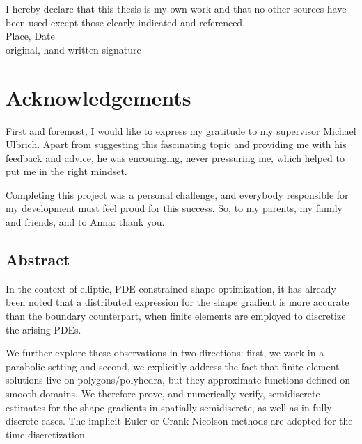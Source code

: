 \documentclass[english,a4paper,9pt,oneside]{scrbook}	%
\theoremstyle{break}
\theoremstyle{remark}
\begin{document}
\vspace*{23cm}
\noindent
I hereby declare that this thesis is my own work and that no other sources have been used except those clearly indicated and referenced.
\\[2cm]
Place, Date\\
original, hand-written signature
\newpage

\chapter*{Acknowledgements}

First and foremost, I would like to express my gratitude to my supervisor Michael Ulbrich. Apart from suggesting this fascinating topic and providing me with his feedback and advice, he was encouraging, never pressuring me, which helped to put me in the right mindset.

Completing this project was a personal challenge, and everybody responsible for my development must feel proud for this success. So, to my parents, my family and friends, and to Anna: thank you.

%



\newpage
\section*{Abstract}
In the context of elliptic, PDE-constrained shape optimization, it has already been noted that a distributed expression for the shape gradient is more accurate than the boundary counterpart, when finite elements are employed to discretize the arising PDEs. 

We further explore these observations in two directions: first, we work in a parabolic setting and second, we explicitly address the fact that finite element solutions live on polygons/polyhedra, but they approximate functions defined on smooth domains. We therefore prove, and numerically verify, semidiscrete estimates for the shape gradients in spatially semidiscrete, as well as in fully discrete cases. The implicit Euler or Crank-Nicolson methods are adopted for the time discretization.
\end{document}
